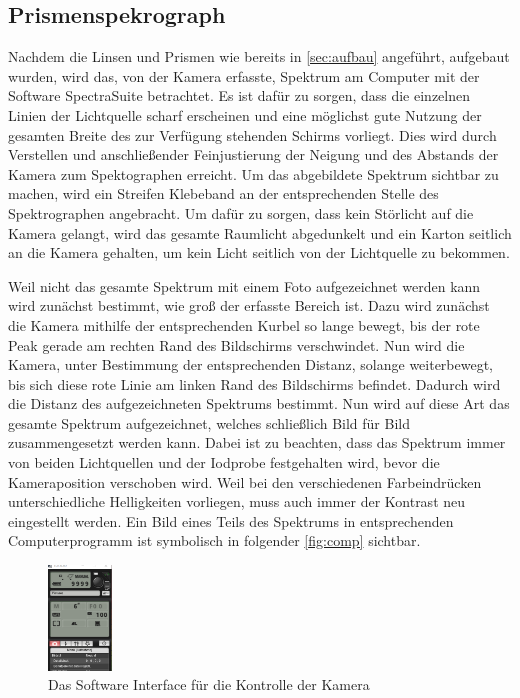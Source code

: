 \documentclass[12pt,english,ngerman]{scrartcl}
\begin{document}
\subsection{Prismenspekrograph}

Nachdem die Linsen und Prismen wie bereits in \autoref{sec:aufbau} angeführt,
aufgebaut wurden, wird das, von der Kamera erfasste, Spektrum am Computer mit
der Software SpectraSuite betrachtet. Es ist dafür zu sorgen, dass die
einzelnen Linien der Lichtquelle scharf erscheinen und eine möglichst gute
Nutzung der gesamten Breite des zur Verfügung stehenden Schirms vorliegt. Dies
wird durch Verstellen und anschließender Feinjustierung der Neigung und des
Abstands der Kamera zum Spektographen erreicht. Um das abgebildete Spektrum
sichtbar zu machen, wird ein Streifen Klebeband an der entsprechenden Stelle
des Spektrographen angebracht. Um dafür zu sorgen, dass kein Störlicht auf die
Kamera gelangt, wird das gesamte Raumlicht abgedunkelt und ein Karton seitlich
an die Kamera gehalten, um kein Licht seitlich von der Lichtquelle zu bekommen.

Weil nicht das gesamte Spektrum mit einem Foto aufgezeichnet werden kann wird
zunächst bestimmt, wie groß der erfasste Bereich ist. Dazu wird zunächst die
Kamera mithilfe der entsprechenden Kurbel so lange bewegt, bis der rote Peak
gerade am rechten Rand des Bildschirms verschwindet. Nun wird die Kamera, unter
Bestimmung der entsprechenden Distanz, solange weiterbewegt, bis sich diese
rote Linie am linken Rand des Bildschirms befindet. Dadurch wird die Distanz
des aufgezeichneten Spektrums bestimmt. Nun wird auf diese Art das gesamte
Spektrum aufgezeichnet, welches schließlich Bild für Bild zusammengesetzt
werden kann. Dabei ist zu beachten, dass das Spektrum immer von beiden
Lichtquellen und der Iodprobe festgehalten wird, bevor die Kameraposition
verschoben wird. Weil bei den verschiedenen Farbeindrücken unterschiedliche
Helligkeiten vorliegen, muss auch immer der Kontrast neu eingestellt werden.
Ein Bild eines Teils des Spektrums in entsprechenden Computerprogramm ist
symbolisch in folgender \autoref{fig:comp} sichtbar.

\begin{figure}
	\begin{center}
		\includegraphics[width=0.15\textwidth]{figures/camerasoftware.png}
	\end{center}
	\caption{Das Software Interface für die Kontrolle der Kamera
	}\label{fig:comp}
\end{figure}
\end{document}
